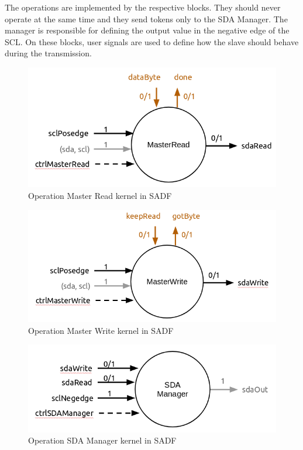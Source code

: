\documentclass{article}
\begin{document}
The operations are implemented by the respective blocks. They should never operate at the same time and they send tokens only to the SDA Manager. The manager is responsible for defining the output value in the negative edge of the SCL. On these blocks, user signals are used to define how the slave should behave during the transmission.
\begin{figure}
  \includegraphics[width=\linewidth]{img/block_read.png}
  \caption{Operation Master Read kernel in SADF}
  \label{fig:block_read}
\end{figure}
\begin{figure}
  \includegraphics[width=\linewidth]{img/block_write.png}
  \caption{Operation Master Write kernel in SADF}
  \label{fig:block_write}
\end{figure}
\begin{figure}
  \includegraphics[width=\linewidth]{img/block_sda.png}
  \caption{Operation SDA Manager kernel in SADF}
  \label{fig:block_sda}
\end{figure}
\end{document}
